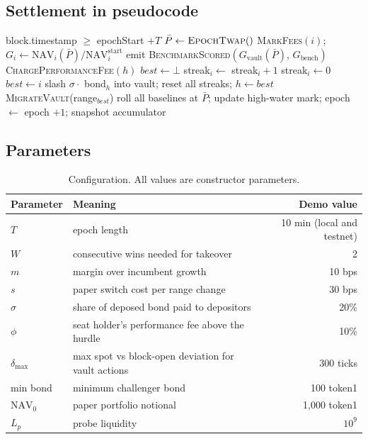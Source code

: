 \documentclass[11pt,a4paper]{article}
\newcommand{\code}[1]{\texttt{\small #1}}
\newcommand{\NAV}{\mathrm{NAV}}
\begin{document}
\subsection{Settlement in pseudocode}
\begin{algorithm}[H]
\caption{\code{settleEpoch}}
\begin{algorithmic}[1]
\Require block.timestamp $\ge$ epochStart $+ T$
\State $\bar P \gets \textsc{EpochTwap}()$
  \State \textsc{MarkFees}$(i)$; \quad $G_i \gets \NAV_i(\bar P) / \NAV_i^{\text{start}}$
\EndFor
\State emit \textsc{BenchmarkScored}$(G_{\text{vault}}(\bar P),\, G_{\text{bench}})$
\State \textsc{ChargePerformanceFee}$(h)$ 
\State $best \gets \bot$
   \State streak$_i \gets$ streak$_i + 1$
  \Else \State streak$_i \gets 0$ \EndIf
   \State $best \gets i$ \EndIf
\EndFor
{}
  \State slash $\sigma \cdot$ bond$_h$ into vault; reset all streaks; $h \gets best$
  \State \textsc{MigrateVault}(range$_{best}$)
\EndIf
\State roll all baselines at $\bar P$; update high-water mark; epoch $\gets$ epoch $+1$; snapshot accumulator
\end{algorithmic}
\end{algorithm}

\subsection{Parameters}
\begin{table}[H]
\centering\small
\begin{tabular}{@{}llr@{}}
\toprule
\textbf{Parameter} & \textbf{Meaning} & \textbf{Demo value} \\
\midrule
$T$ & epoch length & 10 min (local and testnet) \\
$W$ & consecutive wins needed for takeover & 2 \\
$m$ & margin over incumbent growth & 10 bps \\
$s$ & paper switch cost per range change & 30 bps \\
$\sigma$ & share of deposed bond paid to depositors & 20\% \\
$\phi$ & seat holder's performance fee above the hurdle & 10\% \\
$\delta_{\max}$ & max spot vs block-open deviation for vault actions & 300 ticks \\
min bond & minimum challenger bond & 100 token1 \\
$\NAV_0$ & paper portfolio notional & 1{,}000 token1 \\
$L_p$ & probe liquidity & $10^9$ \\
\bottomrule
\end{tabular}
\caption{Configuration. All values are constructor parameters.}
\end{table}
\end{document}
